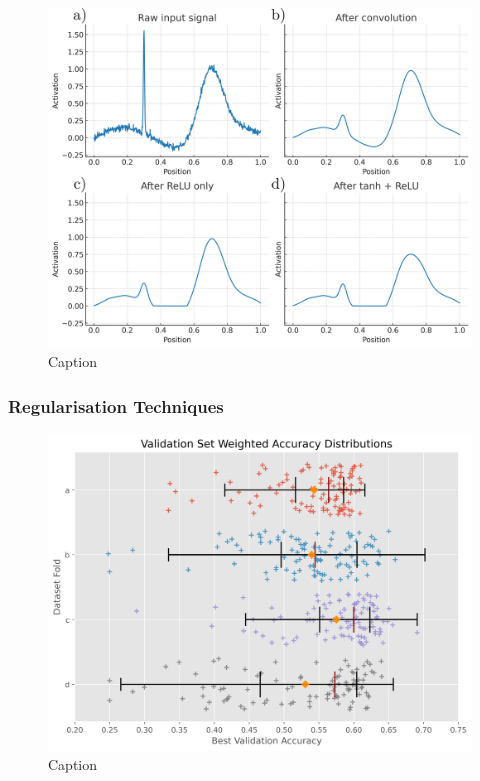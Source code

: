 \begin{figure}[htbp]
  \centering
  \includegraphics[width=1\textwidth]{Images/Tanh_Relu_Demo.png}
  \caption{Caption}
  \label{fig:my-label}
\end{figure}
\subsubsection{Regularisation Techniques}

\begin{figure}[htbp] 
    \centering 
    \includegraphics[width=1\textwidth]{Images/best_val_accuracy.png} 
    \caption{Caption} \label{fig:my-label}
\end{figure}

